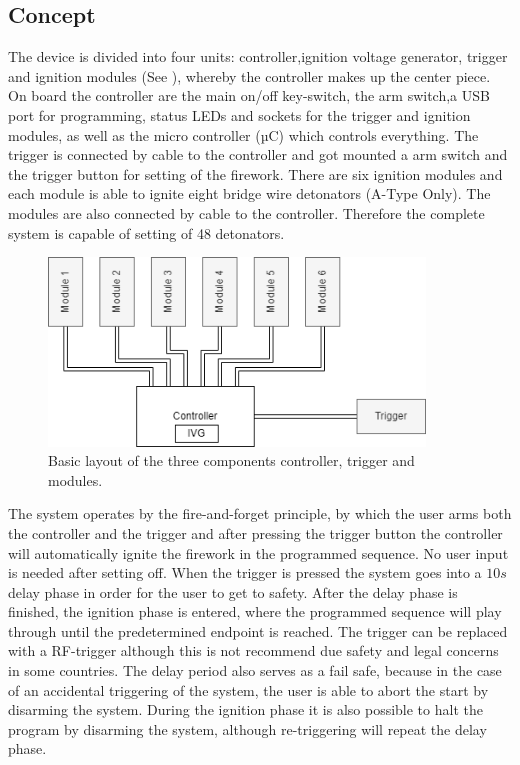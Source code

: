 \pagebreak
\subsection{Concept}
\label{Concept}
The device is divided into four units: controller,ignition voltage generator, trigger and ignition modules (See ), whereby the controller makes up the center piece. On board the controller are the main on/off key-switch, the arm switch,a USB port for programming, status LEDs and sockets for the trigger and ignition modules, as well as the micro controller (µC) which controls everything. The trigger is connected by cable to the controller and got mounted a arm switch and the trigger button for setting of the firework. There are six ignition modules and each module is able to ignite eight bridge wire detonators (A-Type Only). The modules are also connected by cable to the controller.  Therefore the complete system is capable of setting of 48 detonators.

\begin{figure}[!ht]
    \centering
    \includegraphics[width=10cm]{./Figures/concept_all.png}
    \caption{Basic layout of the three components controller, trigger and modules.}
    \label{fig:concept}     
\end{figure}

\noindent The system operates by the fire-and-forget principle, by which the user arms both the controller and the trigger and after pressing the trigger button the controller will automatically ignite the firework in the programmed sequence. No user input is needed after setting off. When the trigger is pressed the system goes into a $10s$ delay phase in order for the user to get to safety. After the delay phase is finished, the ignition phase is entered, where the programmed sequence will play through until the predetermined endpoint is reached. The trigger can be replaced with a RF-trigger although this is not recommend due safety and legal concerns in some countries. The delay period also serves as a fail safe, because in the case of an accidental triggering of the system, the user is able to abort the start by disarming the system. During the ignition phase it is also possible to halt the program by disarming the system, although re-triggering will repeat the delay phase.\\

